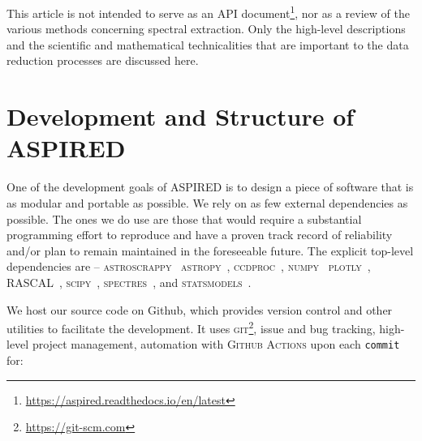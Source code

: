 \documentclass[linenumbers, twocolumn]{aastex631}
\begin{document}
This article is not intended to serve as an API document\footnote{\url{https://aspired.readthedocs.io/en/latest}\label{rtd}}, nor as a review of the
various methods concerning spectral extraction. Only the high-level
descriptions and the scientific and mathematical technicalities that are
important to the data reduction processes are discussed here.

\section{Development and Structure of \textsc{ASPIRED}}
\label{sec:development}

One of the development goals of \textsc{ASPIRED} is to design a piece of software that is as
modular and portable as possible. We rely on as few external dependencies as possible.
The ones we do use are those that would require a substantial programming effort to reproduce and have a
proven track record of reliability and/or plan to remain maintained in the
foreseeable future. The explicit top-level dependencies are --
\textsc{astroscrappy}~\citep{curtis_mccully_2018_1482019, 2001PASP..113.1420V}
\textsc{astropy}~\citep{astropy:2013, astropy:2018},
\textsc{ccdproc}~\citep{matt_craig_2017_1069648},
\textsc{numpy}~\citep{2020NumPy-Array}
\textsc{plotly}~\citep{plotly},
\textsc{RASCAL}~\citep{2020ASPC..527..627V},
\textsc{scipy}~\citep{2020SciPy-NMeth},
\textsc{spectres}~\citep{2017arXiv170505165C}, and
\textsc{statsmodels}~\citep{seabold2010statsmodels}. 

We host our source code on Github, which provides version control and other
utilities to facilitate the development. It uses \textsc{git}\footnote{\url{https://git-scm.com}},
issue and bug tracking, high-level project management, automation with \textsc{Github Actions}
upon each \texttt{commit} for:
\end{document}

